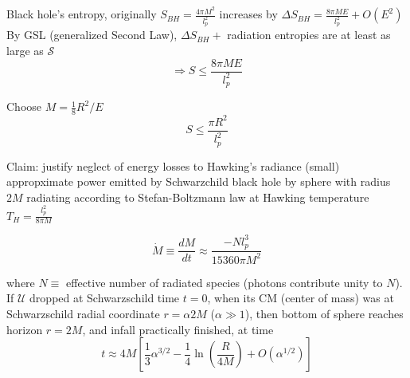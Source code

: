 Black hole's entropy, originally $S_{BH} = \frac{4\pi M^2}{l_p^2}$ increases by $\Delta S_{BH} = \frac{8 \pi ME}{l_p^2} + O(E^2)$ \\

By GSL (generalized Second Law), $\Delta S_{BH} +$ radiation entropies are at least as large as $\mathcal{S}$
\[
\Longrightarrow S \leq \frac{8 \pi ME}{ l_p^2}
\]

Choose $M = \frac{1}{8} R^2/ E$
\[
S \leq \frac{ \pi R^2}{ l_p^2}
\]

Claim: justify neglect of energy losses to Hawking's radiance (small) \\
appropximate power emitted by Schwarzchild black hole by sphere with radius $2M$ radiating according to Stefan-Boltzmann law at Hawking temperature $T_H = \frac{l_p^2}{ 8\pi M}$

\begin{equation}
	\dot{M} \equiv \frac{dM}{dt} \approx \frac{ - Nl_p^3}{ 15360 \pi M^2}
\end{equation}

where $N\equiv $ effective number of radiated species (photons contribute unity to $N$). \\
If $\mathcal{U}$ dropped at Schwarzschild time $t=0$, when its CM (center of mass) was at Schwarzschild radial coordinate $r = \alpha 2M$ ($\alpha \gg 1$), then bottom of sphere reaches horizon $r= 2M$, and infall practically finished, at time 
\begin{equation}
	t \approx 4 M \left[ \frac{1}{3} \alpha^{3/2} - \frac{1}{4} \ln{ \left( \frac{R}{ 4M } \right) } + O(\alpha^{1/2}) \right] 
\end{equation}



